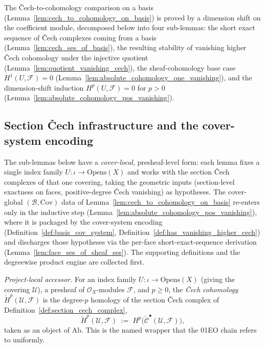 The {\v C}ech-to-cohomology comparison on a basis
(Lemma~\ref{lem:cech_to_cohomology_on_basis}) is proved by a dimension shift on the
coefficient module, decomposed below into four sub-lemmas: the short exact sequence of
{\v C}ech complexes coming from a basis (Lemma~\ref{lem:cech_ses_of_basis}), the
resulting stability of vanishing higher {\v C}ech cohomology under the injective
quotient (Lemma~\ref{lem:quotient_vanishing_cech}), the sheaf-cohomology base case
\(H^1(U, \mathcal{F}) = 0\) (Lemma~\ref{lem:absolute_cohomology_one_vanishing}), and the
  dimension-shift induction \(H^p(U, \mathcal{F}) = 0\) for \(p > 0\)
  (Lemma~\ref{lem:absolute_cohomology_pos_vanishing}).

\subsection{Section {\v C}ech infrastructure and the cover-system encoding}

The sub-lemmas below have a \emph{cover-local}, presheaf-level form: each lemma fixes
a single index family \(U : \iota \to \mathrm{Opens}(X)\) and works with the
section {\v C}ech complexes of that one covering, taking the geometric inputs (section-level
exactness on faces, positive-degree {\v C}ech vanishing) as hypotheses. The cover-global
\((\mathcal{B}, \mathrm{Cov})\) data of Lemma~\ref{lem:cech_to_cohomology_on_basis} re-enters only
in the inductive step (Lemma~\ref{lem:absolute_cohomology_pos_vanishing}), where it is packaged by
the cover-system encoding (Definition~\ref{def:basis_cov_system},
Definition~\ref{def:has_vanishing_higher_cech}) and discharges those hypotheses via the per-face
short-exact-sequence derivation (Lemma~\ref{lem:face_ses_of_sheaf_ses}). The supporting
definitions and the degreewise product engine are collected first.

\begin{definition}\leanok
  \label{def:cech_cohomology_accessor}
  \textit{Project-local accessor.}
  For an index family \(U : \iota \to \mathrm{Opens}(X)\) (giving the covering \(\mathcal{U}\)), a
  presheaf of \(\mathcal{O}_X\)-modules \(\mathcal{F}\), and \(p \geq 0\), the \emph{{\v C}ech
  cohomology} \(\check{H}^p(\mathcal{U}, \mathcal{F})\) is the degree-\(p\) homology of the section
  {\v C}ech complex of Definition~\ref{def:section_cech_complex},
  \[
    \check{H}^p(\mathcal{U}, \mathcal{F}) \;:=\;
      H^p\bigl(\check{\mathcal{C}}^\bullet(\mathcal{U}, \mathcal{F})\bigr),
  \]
  taken as an object of \(\mathrm{Ab}\). This is the named wrapper that the 01EO chain refers to
  uniformly.
\end{definition}

